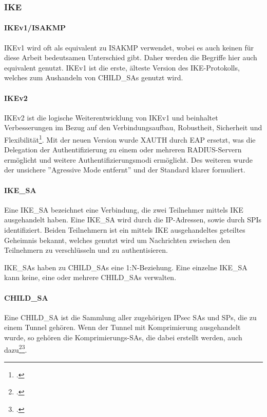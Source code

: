 \subsubsection{IKE}
\paragraph{IKEv1/ISAKMP}
IKEv1 wird oft als equivalent zu \ac{ISAKMP} verwendet, wobei es auch keinen für diese Arbeit bedeutsamen
Unterschied gibt. Daher werden die Begriffe hier auch equivalent genutzt.
IKEv1 ist die erste, älteste Version des \ac{IKE}-Protokolls, welches zum Aushandeln
von CHILD\_SAs genutzt wird.
\paragraph{IKEv2}
IKEv2 ist die logische Weiterentwicklung von IKEv1 und beinhaltet Verbesserungen
im Bezug auf den Verbindungsaufbau, Robustheit, Sicherheit und Flexibilität\footcite[136, 137]{charlie_kaufman_rfc_2014}.
Mit der neuen Version wurde XAUTH durch \ac{EAP} ersetzt, was die Delegation der
Authentifizierung zu einem oder mehreren RADIUS-Servern ermöglicht und weitere Authentifizierungsmodi ermöglicht.
Des weiteren wurde der unsichere ''Agressive Mode entfernt'' und der Standard klarer formuliert.

\paragraph{IKE\_SA}
Eine IKE\_SA bezeichnet eine Verbindung, die zwei Teilnehmer mittels IKE ausgehandelt haben.
Eine IKE\_SA wird durch die \ac{IP}-Adressen, sowie durch \acp{SPI} identifiziert.
Beiden Teilnehmern ist ein mittels \ac{IKE} ausgehandeltes geteiltes Geheimnis bekannt,
welches genutzt wird um Nachrichten zwischen den Teilnehmern zu verschlüsseln und zu authentisieren.

IKE\_SAs haben zu CHILD\_SAs eine 1:N-Beziehung. Eine einzelne IKE\_SA kann keine, eine
oder mehrere CHILD\_SAs verwalten.

\paragraph{CHILD\_SA}
Eine CHILD\_SA ist die Sammlung aller zugehörigen \ac{IPsec} \acp{SA} und \acp{SP},
die zu einem Tunnel gehören. Wenn der Tunnel mit Komprimierung ausgehandelt wurde,
so gehören die Komprimierungs-\acp{SA}, die dabei erstellt werden, auch dazu\footcite[][7]{abraham_shacham_rfc_2001}\footcite[][61]{charlie_kaufman_rfc_2014}.

